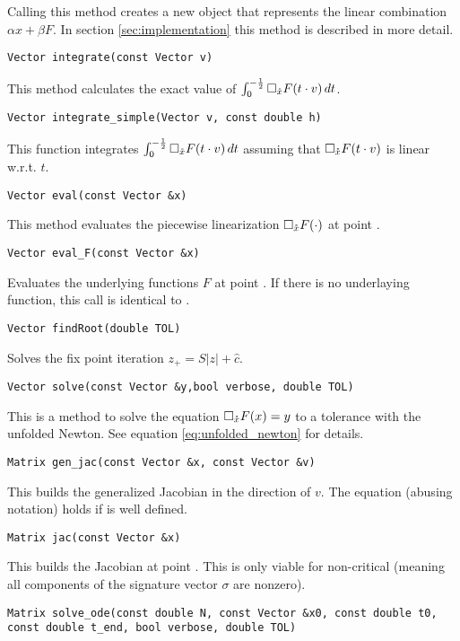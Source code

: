 Calling this method creates a new  object that represents the linear combination $\alpha x + \beta F$. In section  \ref{sec:implementation} this method is described in more detail. 
\begin{lstlisting}[numbers=none]
Vector integrate(const Vector v)
\end{lstlisting}
This method calculates the exact value of $\int_{0}^{-\frac12} \pl_{\rx}F(t\cdot v)\d t$.
\begin{lstlisting}[numbers=none]
Vector integrate_simple(Vector v, const double h)
\end{lstlisting}
This function integrates $\int_{0}^{-\frac12} \pl_{\rx}F(t\cdot v)\d t$ assuming that $\square_{\mathring{x}} F(t\cdot v)$ is linear w.r.t. $t$.
\begin{lstlisting}[numbers=none]
Vector eval(const Vector &x)
\end{lstlisting}
This method evaluates the piecewise linearization $\square_{\mathring{x}} F(\cdot)$ at point .
\begin{lstlisting}[numbers=none]
Vector eval_F(const Vector &x)
\end{lstlisting}
Evaluates the underlying functions $F$ at point . If there is no underlaying function, this call is identical to .
\begin{lstlisting}[numbers=none]
Vector findRoot(double TOL)
\end{lstlisting}
Solves the fix point iteration $z_+ = S |z| + \hat c$.
\begin{lstlisting}[numbers=none]
Vector solve(const Vector &y,bool verbose, double TOL)
\end{lstlisting}
This is a method to solve the equation $\square_{\mathring{x}} F(x) = y$ to a tolerance  with the unfolded Newton. See equation \eqref{eq:unfolded_newton} for details.
\begin{lstlisting}[numbers=none]
Matrix gen_jac(const Vector &x, const Vector &v)
\end{lstlisting}
This builds the generalized Jacobian in the direction of $v$. The equation  (abusing notation) holds if  is well defined.
\begin{lstlisting}[numbers=none]
Matrix jac(const Vector &x)
\end{lstlisting}
This builds the Jacobian at point . This is only viable for non-critical  (meaning all components of the signature vector $\sigma$ are nonzero).
\begin{lstlisting}[numbers=none]
Matrix solve_ode(const double N, const Vector &x0, const double t0, const double t_end, bool verbose, double TOL)
\end{lstlisting}

